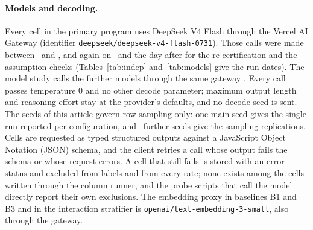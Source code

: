 \keeprunin
\paragraph{Models and decoding.} Every cell in the
primary program uses DeepSeek V4 Flash through the Vercel AI Gateway
(identifier \texttt{deepseek/deepseek-v4-flash-0731}).
Those calls were made between \ledgerStart\ and \ledgerEnd, and
again on \sepSnapshotDate\ and the day after for the re-certification
and the assumption checks (Tables~\ref{tab:indep} and~\ref{tab:models} give the run
dates).
The model study calls the further models through the same gateway
\famRunDate. Every call passes temperature $0$ and no other decode
parameter; maximum output length and reasoning effort stay at the
provider's defaults, and no decode seed is sent. The seeds of this article
govern row sampling only: one main seed gives the single run reported
per configuration, and \bootB\ further seeds give the sampling
replications. Cells are requested as typed structured outputs against a
JavaScript Object Notation (JSON) schema, and the client retries a call whose output fails the schema
or whose request errors. A cell that still fails is stored with an error
status and excluded from labels and from every rate; none exists among
the cells written through the column runner, and the probe scripts that
call the model directly report their own exclusions. The embedding proxy
in baselines B1 and B3 and in the interaction stratifier is
\texttt{openai/text-embedding-3-small}, also through the gateway.

